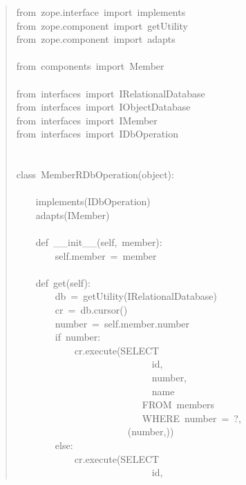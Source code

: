 \documentclass[a4paper,openany,twoside,final]{book}
\begin{document}
\begin{quote}{\ttfamily \raggedright \noindent
from~zope.interface~import~implements\\
from~zope.component~import~getUtility\\
from~zope.component~import~adapts\\
~\\
from~components~import~Member\\
~\\
from~interfaces~import~IRelationalDatabase\\
from~interfaces~import~IObjectDatabase\\
from~interfaces~import~IMember\\
from~interfaces~import~IDbOperation\\
~\\
~\\
class~MemberRDbOperation(object):\\
~\\
~~~~implements(IDbOperation)\\
~~~~adapts(IMember)\\
~\\
~~~~def~\_\_init\_\_(self,~member):\\
~~~~~~~~self.member~=~member\\
~\\
~~~~def~get(self):\\
~~~~~~~~db~=~getUtility(IRelationalDatabase)\\
~~~~~~~~cr~=~db.cursor()\\
~~~~~~~~number~=~self.member.number\\
~~~~~~~~if~number:\\
~~~~~~~~~~~~cr.execute(\textquotedbl{}\textquotedbl{}\textquotedbl{}SELECT\\
~~~~~~~~~~~~~~~~~~~~~~~~~~~~id,\\
~~~~~~~~~~~~~~~~~~~~~~~~~~~~number,\\
~~~~~~~~~~~~~~~~~~~~~~~~~~~~name\\
~~~~~~~~~~~~~~~~~~~~~~~~~~FROM~members\\
~~~~~~~~~~~~~~~~~~~~~~~~~~WHERE~number~=~?\textquotedbl{}\textquotedbl{}\textquotedbl{},\\
~~~~~~~~~~~~~~~~~~~~~~~(number,))\\
~~~~~~~~else:\\
~~~~~~~~~~~~cr.execute(\textquotedbl{}\textquotedbl{}\textquotedbl{}SELECT\\
~~~~~~~~~~~~~~~~~~~~~~~~~~~~id,\\
}
\end{quote}
\end{document}
